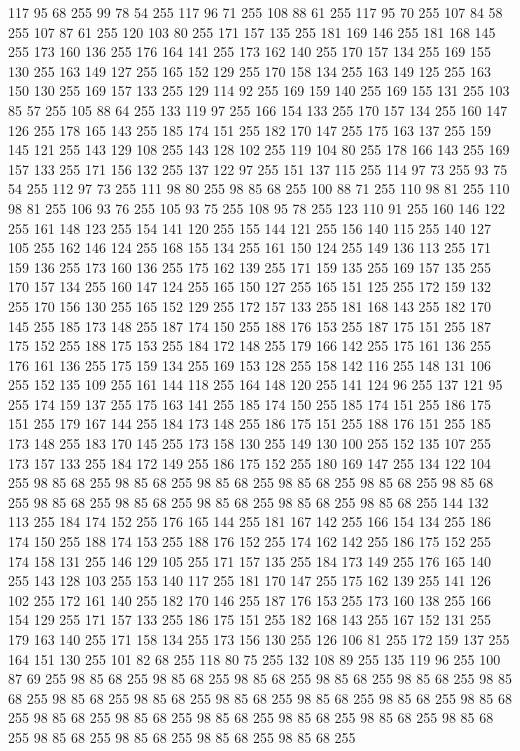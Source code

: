 117 95 68 255 99 78 54 255 117 96 71 255 108 88 61 255 117 95 70 255 107 84 58 255 107 87 61 255 120 103 80 255 171 157 135 255 181 169 146 255 181 168 145 255 173 160 136 255 176 164 141 255 173 162 140 255 170 157 134 255 169 155 130 255 163 149 127 255 165 152 129 255 170 158 134 255 163 149 125 255 163 150 130 255 169 157 133 255 129 114 92 255 169 159 140 255 169 155 131 255 103 85 57 255 105 88 64 255 133 119 97 255 166 154 133 255 170 157 134 255 160 147 126 255 178 165 143 255 185 174 151 255 182 170 147 255 175 163 137 255 159 145 121 255 143 129 108 255 143 128 102 255 119 104 80 255 178 166 143 255 169 157 133 255 171 156 132 255 137 122 97 255 151 137 115 255 114 97 73 255 93 75 54 255 112 97 73 255 111 98 80 255 98 85 68 255 100 88 71 255 110 98 81 255 110 98 81 255 106 93 76 255 105 93 75 255 108 95 78 255 123 110 91 255 160 146 122 255 161 148 123 255 154 141 120 255 155 144 121 255 156 140 115 255 140 127 105 255 162 146 124 255 168 155 134 255
161 150 124 255 149 136 113 255 171 159 136 255 173 160 136 255 175 162 139 255 171 159 135 255 169 157 135 255 170 157 134 255 160 147 124 255 165 150 127 255 165 151 125 255 172 159 132 255 170 156 130 255 165 152 129 255 172 157 133 255 181 168 143 255 182 170 145 255 185 173 148 255 187 174 150 255 188 176 153 255 187 175 151 255 187 175 152 255 188 175 153 255 184 172 148 255 179 166 142 255 175 161 136 255 176 161 136 255 175 159 134 255 169 153 128 255 158 142 116 255 148 131 106 255 152 135 109 255 161 144 118 255 164 148 120 255 141 124 96 255 137 121 95 255 174 159 137 255 175 163 141 255 185 174 150 255 185 174 151 255 186 175 151 255 179 167 144 255 184 173 148 255 186 175 151 255 188 176 151 255 185 173 148 255 183 170 145 255 173 158 130 255 149 130 100 255 152 135 107 255 173 157 133 255 184 172 149 255 186 175 152 255 180 169 147 255 134 122 104 255 98 85 68 255 98 85 68 255 98 85 68 255 98 85 68 255 98 85 68 255 98 85 68 255 98 85 68 255 98 85 68 255 98 85 68 255
98 85 68 255 98 85 68 255 144 132 113 255 184 174 152 255 176 165 144 255 181 167 142 255 166 154 134 255 186 174 150 255 188 174 153 255 188 176 152 255 174 162 142 255 186 175 152 255 174 158 131 255 146 129 105 255 171 157 135 255 184 173 149 255 176 165 140 255 143 128 103 255 153 140 117 255 181 170 147 255 175 162 139 255 141 126 102 255 172 161 140 255 182 170 146 255 187 176 153 255 173 160 138 255 166 154 129 255 171 157 133 255 186 175 151 255 182 168 143 255 167 152 131 255 179 163 140 255 171 158 134 255 173 156 130 255 126 106 81 255 172 159 137 255 164 151 130 255 101 82 68 255 118 80 75 255 132 108 89 255 135 119 96 255 100 87 69 255 98 85 68 255 98 85 68 255 98 85 68 255 98 85 68 255 98 85 68 255 98 85 68 255 98 85 68 255 98 85 68 255 98 85 68 255 98 85 68 255 98 85 68 255 98 85 68 255 98 85 68 255 98 85 68 255 98 85 68 255 98 85 68 255 98 85 68 255 98 85 68 255 98 85 68 255 98 85 68 255 98 85 68 255 98 85 68 255
